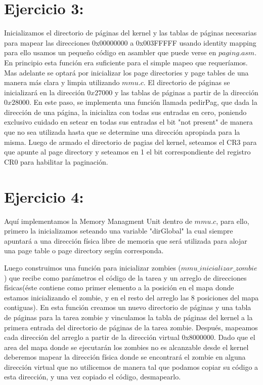\documentclass[a4paper]{article}
\begin{document}
\section{Ejercicio 3:}
%

Inicializamos el directorio de páginas del kernel y las tablas de páginas necesarias para mapear las direcciones 0x00000000 a 0x003FFFFF usando identity mapping para ello usamos un pequeño código en asambler que puede verse en $paging.asm$. En principio esta función era suficiente para el simple mapeo que requeríamos. Mas adelante se optará por inicializar los page directories y page tables de una manera más clara y limpia utilizando $mmu.c$. El directorio de páginas se inicializará en la dirección $0x27000$ y las tablas de páginas a partir de la dirección $0x28000$. En este paso, se implementa una función llamada pedirPag, que dada la dirección de una página, la inicializa con todas sus entradas en cero, poniendo exclusivo cuidado en setear en todas sus entradas el bit "not present" de manera que no sea utilizada hasta que se determine una dirección apropiada para la misma. 
Luego de armado el directorio de pagias del kernel, seteamos el CR3 para que apunte al page directory y seteamos en 1 el bit correspondiente del registro CR0 para habilitar la paginación.

\section{Ejercicio 4:}
%

Aquí implementamos la Memory Managment Unit dentro de $mmu.c$, para ello, primero la inicializamos seteando una variable "dirGlobal" la cual siempre apuntará a una dirección física libre de memoria que será utilizada para alojar una page table o page directory según corresponda.

Luego construimos una función para inicializar zombies ($mmu\_ inicializar\_ zombie$) que recibe como parámetros el código de la tarea y un arreglo de direcciones físicas(éste contiene como primer elemento a la posición en el mapa donde estamos inicializando el zombie, y en el resto del arreglo las 8 posiciones del mapa contiguas). En esta función creamos un nuevo directorio de páginas y una tabla de páginas para la tarea zombie y vinculamos la tabla de páginas del kernel a la primera entrada del directorio de páginas de la tarea zombie. Después, mapeamos cada dirección del arreglo a partir de la dirección virtual 0x8000000. 
Dado que el area del mapa donde se ejecutarán los zombies no es alcanzable desde el kernel deberemos mapear la dirección física donde se encontrará el zombie en alguna dirección virtual que no utilicemos de manera tal que podamos copiar su código a esta dirección, y una vez copiado el código, desmapearlo.
\end{document}
